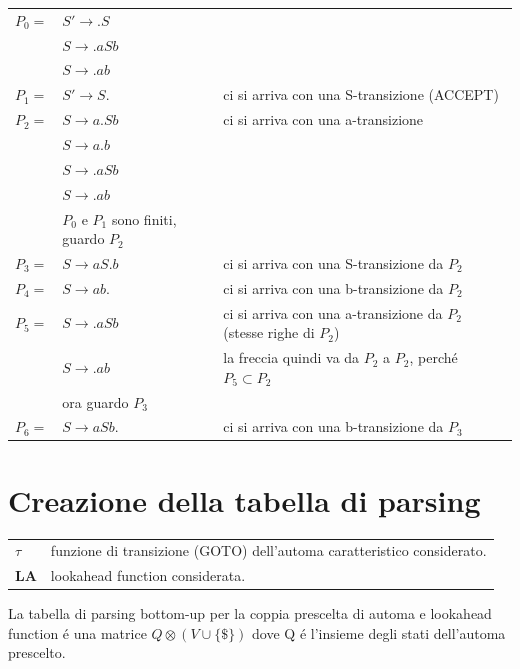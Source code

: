 \begin{tabular}{lll}
	$P_0=$ 	&	$S' \rightarrow .S$ 	& \\
			&	$S \rightarrow .aSb$ 	& \\
		 	&	$S \rightarrow .ab$ 	& \\
	$P_1=$ 	&	$S' \rightarrow S.$ 	& ci si arriva con una S-transizione (ACCEPT)\\
	$P_2=$ 	&	$S \rightarrow a.Sb$ 	& ci si arriva con una a-transizione\\
			&	$S \rightarrow a.b$ 	& \\
		 	&	$S \rightarrow .aSb$ 	& \\
		 	&	$S \rightarrow .ab$ 	& \\
		 	& 	$P_0 \text{ e } P_1$ sono finiti, guardo $P_2$ & \\
	$P_3=$ 	&	$S \rightarrow aS.b$ 	& ci si arriva con una S-transizione da $P_2$\\
	$P_4=$ 	&	$S \rightarrow ab.$ 	& ci si arriva con una b-transizione da $P_2$\\
	$P_5=$ 	&	$S \rightarrow .aSb$ 	& ci si arriva con una a-transizione da $P_2$ (stesse righe di $P_2$)\\
		 	&	$S \rightarrow .ab$ 	& la freccia quindi va da $P_2$ a $P_2$, perch\'e $P_5 \subset P_2$\\
		 	&	ora guardo $P_3$	& \\
	$P_6=$ 	&	$S \rightarrow aSb.$ 	& ci si arriva con una b-transizione da $P_3$\\
\end{tabular}  

\section{Creazione della tabella di parsing}

\begin{tabular}{ll}
	$\tau$ 		&	funzione di transizione (GOTO) dell'automa caratteristico considerato.\\
	\textbf{LA} 	& 	lookahead function considerata.\\
\end{tabular}

La tabella di parsing bottom-up per la coppia prescelta di automa e lookahead function \'e una matrice 
$Q \otimes (V \cup \{ \$ \})$ dove Q \'e l'insieme degli stati dell'automa prescelto. \\[10pt]

